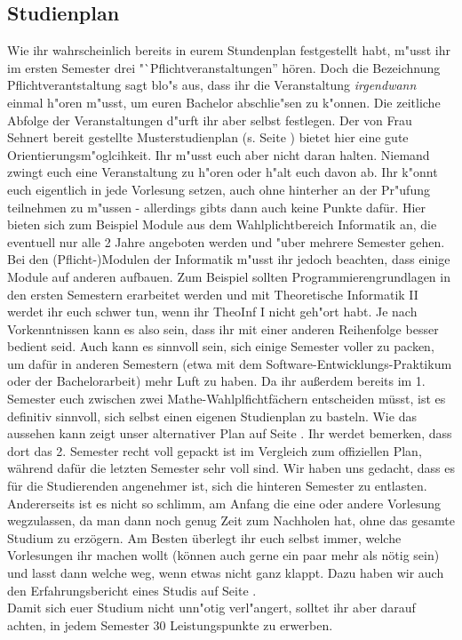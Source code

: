 \subsection{Studienplan}
\label{bach_studienplan}
Wie ihr wahrscheinlich bereits in eurem Stundenplan festgestellt habt,
m"usst ihr im ersten Semester drei "`Pflichtveranstaltungen'' hören.  
Doch die Bezeichnung Pflichtverantstaltung sagt blo"s aus, dass ihr die Veranstaltung \emph{irgendwann} einmal h"oren m"usst, um euren Bachelor abschlie"sen zu k"onnen.
Die zeitliche Abfolge der Veranstaltungen d"urft ihr aber selbst festlegen.
Der von Frau Sehnert bereit gestellte Musterstudienplan (s. Seite \pageref{musterstudienplan}) bietet hier eine gute Orientierungsm"oglcihkeit.
Ihr m"usst euch aber nicht daran halten. Niemand zwingt euch eine Veranstaltung zu h"oren oder h"alt euch davon ab.
Ihr k"onnt euch eigentlich in jede Vorlesung setzen, auch ohne
hinterher an der Pr"ufung teilnehmen zu m"ussen - allerdings gibts
dann auch keine Punkte dafür. 
Hier bieten sich zum Beispiel Module aus dem Wahlplichtbereich Informatik an, die eventuell nur alle 2 Jahre angeboten werden und "uber mehrere Semester gehen.
Bei den (Pflicht-)Modulen der Informatik m"usst ihr jedoch beachten, dass einige Module auf anderen aufbauen.
Zum Beispiel sollten Programmierengrundlagen in den ersten  Semestern
erarbeitet werden und mit Theoretische Informatik II werdet ihr euch
schwer tun, wenn ihr TheoInf I nicht geh"ort habt.
Je nach Vorkenntnissen kann es also sein,
dass ihr mit einer anderen Reihenfolge besser bedient seid. Auch kann
es sinnvoll sein, sich einige Semester voller zu packen, um dafür in
anderen Semestern (etwa mit dem Software-Entwicklungs-Praktikum oder
der Bachelorarbeit) mehr Luft zu haben. Da ihr außerdem bereits im
1. Semester euch zwischen zwei Mathe-Wahlplfichtfächern entscheiden
müsst, ist es definitiv sinnvoll, sich selbst einen eigenen
Studienplan zu basteln. Wie das aussehen kann zeigt unser alternativer
Plan auf Seite \pageref{studienplan_neu}. Ihr werdet bemerken, dass
dort das 2. Semester recht voll gepackt ist im Vergleich zum
offiziellen Plan, während dafür die letzten Semester sehr voll
sind. Wir haben uns gedacht, dass es für die Studierenden angenehmer
ist, sich die hinteren Semester zu entlasten. Andererseits ist es
nicht so schlimm, am Anfang die eine oder andere Vorlesung
wegzulassen, da man dann noch genug Zeit zum Nachholen hat, ohne das
gesamte Studium zu erzögern. Am Besten überlegt ihr euch selbst immer,
welche Vorlesungen ihr machen wollt (können auch gerne ein paar mehr
als nötig sein) und lasst dann welche weg, wenn etwas nicht ganz
klappt. Dazu haben wir auch den Erfahrungsbericht eines Studis auf
Seite \pageref{studienplan_bericht}. 
\\
Damit sich euer Studium nicht unn"otig verl"angert, solltet ihr aber darauf achten, in jedem Semester 30 Leistungspunkte zu erwerben. 


